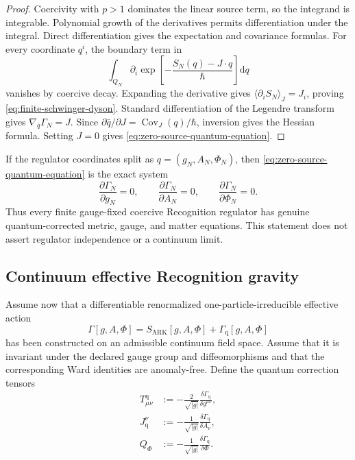 \begin{proof}
Coercivity with $p>1$ dominates the linear source term, so the integrand is integrable. Polynomial growth of the derivatives permits differentiation under the integral. Direct differentiation gives the expectation and covariance formulas. For every coordinate $q^i$, the boundary term in
\[
\int_{Q_N}\partial_i
\exp\left[-\frac{S_N(q)-J\cdot q}{\hbar}\right]\mathrm dq
\]
vanishes by coercive decay. Expanding the derivative gives
$\langle\partial_iS_N\rangle_J=J_i$, proving \eqref{eq:finite-schwinger-dyson}. Standard differentiation of the Legendre transform gives
$\nabla_{\bar q}\Gamma_N=J$. Since
$\partial\bar q/\partial J=\operatorname{Cov}_J(q)/\hbar$, inversion gives the Hessian formula. Setting $J=0$ gives \eqref{eq:zero-source-quantum-equation}.
\end{proof}

\begin{corollary}
If the regulator coordinates split as $q=(g_N,A_N,\Phi_N)$, then \eqref{eq:zero-source-quantum-equation} is the exact system
\[
\frac{\partial\Gamma_N}{\partial g_N}=0,
\qquad
\frac{\partial\Gamma_N}{\partial A_N}=0,
\qquad
\frac{\partial\Gamma_N}{\partial\Phi_N}=0.
\]
Thus every finite gauge-fixed coercive Recognition regulator has genuine quantum-corrected metric, gauge, and matter equations. This statement does not assert regulator independence or a continuum limit.
\end{corollary}

\subsection{Continuum effective Recognition gravity}

Assume now that a differentiable renormalized one-particle-irreducible effective action
\[
\Gamma[g,A,\Phi]
=S_{\mathrm{ARK}}[g,A,\Phi]+\Gamma_{\mathrm q}[g,A,\Phi]
\]
has been constructed on an admissible continuum field space. Assume that it is invariant under the declared gauge group and diffeomorphisms and that the corresponding Ward identities are anomaly-free. Define the quantum correction tensors
\begin{align}
T^{\mathrm q}_{\mu\nu}
&:=-\frac{2}{\sqrt{|g|}}
\frac{\delta\Gamma_{\mathrm q}}{\delta g^{\mu\nu}},
\label{eq:quantum-stress}\\
J_{\mathrm q}^{\nu}
&:=-\frac{1}{\sqrt{|g|}}
\frac{\delta\Gamma_{\mathrm q}}{\delta A_\nu},
\label{eq:quantum-current}\\
Q_{\Phi}
&:=-\frac{1}{\sqrt{|g|}}
\frac{\delta\Gamma_{\mathrm q}}{\delta\Phi}.
\label{eq:quantum-field-source}
\end{align}

